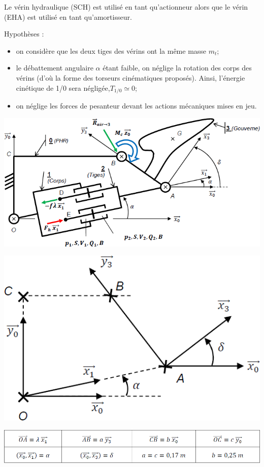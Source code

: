 \begin{multicols}{2}
Le vérin hydraulique (SCH) est utilisé en tant qu’actionneur alors que le vérin (EHA) est utilisé en tant qu’amortisseur.

Hypothèses :
\begin{itemize}
\item on considère que les deux tiges des vérins ont la même masse $m_t$;
\item le débattement angulaire $\alpha$ étant faible, on néglige la rotation des corps des vérins (d’où la forme des torseurs cinématiques proposés). Ainsi, l’énergie cinétique de 1/0 sera négligée,$T_{1/0}\simeq 0$;
\item on néglige les forces de pesanteur devant les actions mécaniques mises en jeu.
\end{itemize}


\begin{center}
\includegraphics[width=\linewidth]{images/fig_10}

\includegraphics[width=\linewidth]{images/fig_10_a}

\includegraphics[width=\linewidth]{images/fig_10_b}


\end{center}
\end{multicols}
